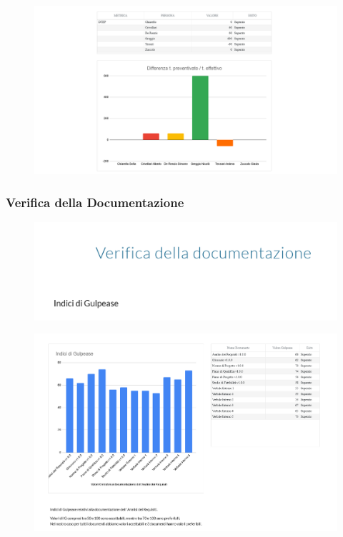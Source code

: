 \begin{figure}[H]
	\includegraphics[scale=0.5]{res/images/cruscotto/adr_4.png}
\end{figure}
\subsubsection{Verifica della Documentazione}
\begin{figure}[H]
	\includegraphics[scale=0.5]{res/images/cruscotto/adr_5.png}
\end{figure}
\begin{figure}[H]
	\includegraphics[scale=0.5]{res/images/cruscotto/adr_6.png}
\end{figure}
